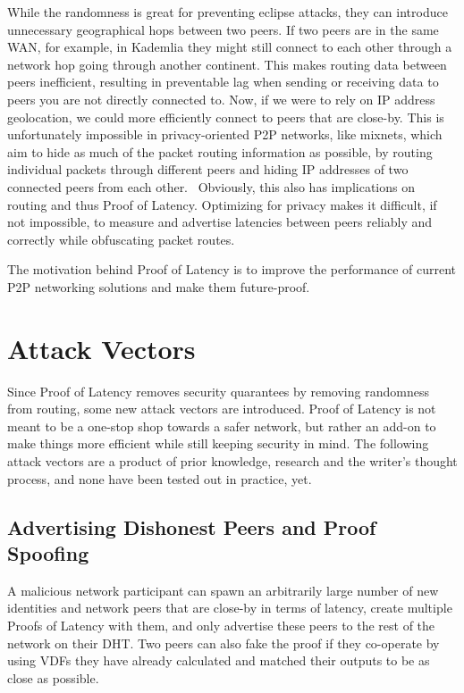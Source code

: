 While the randomness is great for preventing eclipse attacks, they can introduce unnecessary geographical hops between two peers. If two peers are in the same WAN, for example, in Kademlia they might still connect to each other through a network hop going through another continent. This makes routing data between peers inefficient, resulting in preventable lag when sending or receiving data to peers you are not directly connected to.
Now, if we were to rely on IP address geolocation, we could more efficiently connect to peers that are close-by. This is unfortunately impossible in privacy-oriented P2P networks, like mixnets, which aim to hide as much of the packet routing information as possible, by routing individual packets through different peers and hiding IP addresses of two connected peers from each other.~\cite{Harry_Halpin_undated-sq} Obviously, this also has implications on routing and thus Proof of Latency. Optimizing for privacy makes it difficult, if not impossible, to measure and advertise latencies between peers reliably and correctly while obfuscating packet routes.

The motivation behind Proof of Latency is to improve the performance of current P2P networking solutions and make them future-proof.

\section{Attack Vectors}
Since Proof of Latency removes security quarantees by removing randomness from routing, some new attack vectors are introduced. Proof of Latency is not meant to be a one-stop shop towards a safer network, but rather an add-on to make things more efficient while still keeping security in mind. The following attack vectors are a product of prior knowledge, research and the writer's thought process, and none have been tested out in practice, yet.

\subsection{Advertising Dishonest Peers and Proof Spoofing}
A malicious network participant can spawn an arbitrarily large number of new identities and network peers that are close-by in terms of latency, create multiple Proofs of Latency with them, and only advertise these peers to the rest of the network on their DHT. Two peers can also fake the proof if they co-operate by using VDFs they have already calculated and matched their outputs to be as close as possible.

